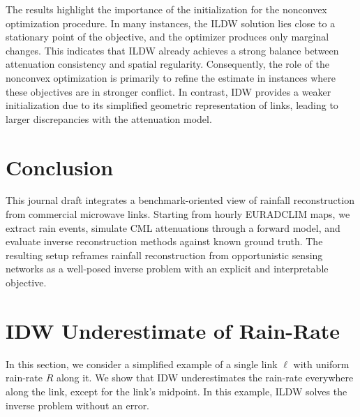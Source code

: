 \documentclass[a4paper,fleqn]{cas-sc}
\begin{document}
The results highlight the importance of the initialization for the nonconvex optimization procedure. In many instances, the ILDW solution lies close to a stationary point of the objective, and the optimizer produces only marginal changes. This indicates that ILDW already achieves a strong balance between attenuation consistency and spatial regularity. Consequently, the role of the nonconvex optimization is primarily to refine the estimate in instances where these objectives are in stronger conflict. In contrast, IDW provides a weaker initialization due to its simplified geometric representation of links, leading to larger discrepancies with the attenuation model.
\section{Conclusion}
This journal draft integrates a benchmark-oriented view of rainfall reconstruction from commercial microwave links. Starting from hourly EURADCLIM maps, we extract rain events, simulate CML attenuations through a forward model, and evaluate inverse reconstruction methods against known ground truth. The resulting setup reframes rainfall reconstruction from opportunistic sensing networks as a well-posed inverse problem with an explicit and interpretable objective.



\appendix
{}
\section{IDW Underestimate of Rain-Rate}
\label{appendix:IDW underestimate}
In this section, we consider a simplified example of a single link $\ell$ with uniform rain-rate $R$ along it.
We show that IDW underestimates the rain-rate everywhere along the link, except for the link's midpoint. In this example, ILDW solves the inverse problem without an error.
\end{document}
